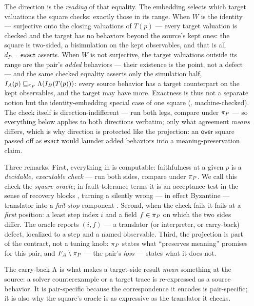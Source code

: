 The direction is the \emph{reading} of that equality. The embedding
selects which target valuations the square checks: exactly those in its
range. When $W$ is the identity --- surjective onto the closing
valuations of $T(p)$ --- every target valuation is checked and the
target has no behaviors beyond the source's kept ones: the square is
two-sided, a bisimulation on the kept observables, and that is all
$d_P = \mathsf{exact}$ asserts. When $W$ is not surjective, the target
valuations outside its range are the pair's \emph{added} behaviors ---
their existence is the point, not a defect --- and the same checked
equality asserts only the simulation half,
$I_A(p) \sqsubseteq_{\pi_P} \Lambda(I_B(T(p)))$: every source behavior
has a target counterpart on the kept observables, and the target may
have more. Exactness is thus not a separate notion but the
identity-embedding special case of one square (,
machine-checked). The check itself is direction-indifferent --- run
both legs, compare under $\pi_P$ --- so everything below applies to
both directions verbatim; only what agreement \emph{means} differs,
which is why direction is protected like the projection: an
$\mathsf{over}$ square passed off as $\mathsf{exact}$ would launder
added behaviors into a meaning-preservation claim.

Three remarks. First, everything in  is computable:
faithfulness at a given $p$ is a \emph{decidable, executable check} --- run
both sides, compare under $\pi_P$. We call this check the
\emph{square oracle}; in fault-tolerance terms it is an acceptance test
in the sense of recovery blocks \citep{randell1975recovery}, turning a
silently wrong --- in effect Byzantine --- translator into a
\emph{fail-stop} component \citep{schlichting1983failstop}. Second, when the check fails it fails at a
\emph{first} position: a least step index $i$ and a field
$f \in \pi_P$ on which the two sides differ. The oracle reports
$(i, f)$ --- a translator (or interpreter, or carry-back) defect, localized
to a step and a named observable. Third, the projection is part of the
contract, not a tuning knob: $\pi_P$ states what ``preserves meaning''
promises for this pair, and $F_A \setminus \pi_P$ --- the pair's
\emph{loss} --- states what it does not.

The carry-back $\Lambda$ is what makes a target-side result \emph{mean}
something at the source: a solver counterexample or a target trace is
re-expressed as a source behavior. It is pair-specific because the
correspondence it encodes is pair-specific; it is also why the square's
oracle is as expressive as the translator it checks.

